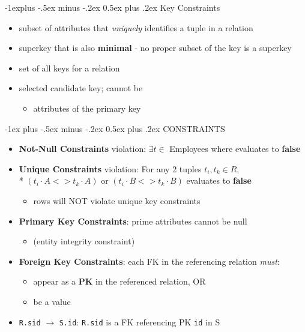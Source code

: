\documentclass[10pt, landscape]{article}
\makeatletter
\renewcommand{\section}{\@startsection{section}{1}{0mm}%
  {-1ex plus -.5ex minus -.2ex}%
  {0.5ex plus .2ex}%
{\normalfont\large\bfseries}}
\renewcommand{\subsection}{\@startsection{subsection}{2}{0mm}%
  {-1explus -.5ex minus -.2ex}%
  {0.5ex plus .2ex}%
{\normalfont\normalsize\bfseries}}
\makeatother
\begin{document}
\begin{multicols}{4}
  \subsection{Key Constraints}
  \begin{itemize}
    \item {} subset of attributes that \textit{uniquely} identifies a tuple in a relation
    \item {} superkey that is also \textbf{minimal} - no proper subset of the key is a superkey
    \item {} set of all keys for a relation
    \item {} selected candidate key; cannot be 
      \begin{itemize}
        \item {} attributes of the primary key
      \end{itemize}
  \end{itemize}

  \section{CONSTRAINTS}
  \begin{itemize}
    \item \textbf{Not-Null Constraints} violation: $\exists t \in$ Employees where  evaluates to \textbf{false}
    \item \textbf{Unique Constraints} violation: For any 2 tuples $t_i, t_k \in R$, \\*
      $(t_i\cdot A <> t_k\cdot A)$ or  $(t_i\cdot B <> t_k \cdot B)$ evaluates to  \textbf{false}
      \begin{itemize}
        \item \attention {} rows will NOT violate unique key constraints
      \end{itemize}
    \item \textbf{Primary Key Constraints}: prime attributes cannot be null
      \begin{itemize}
        \item (entity integrity constraint)
      \end{itemize}
    \item \textbf{Foreign Key Constraints}: each FK in the referencing relation \textit{must}:
      \begin{itemize}
        \item appear as a \textbf{PK} in the referenced relation, OR 
        \item be a  value
      \end{itemize}
    \item \texttt{R.sid} $\rightarrow$ \texttt{S.id}: \texttt{R.sid} is a FK referencing PK \texttt{id} in S
  \end{itemize}


\end{multicols}
\end{document}

